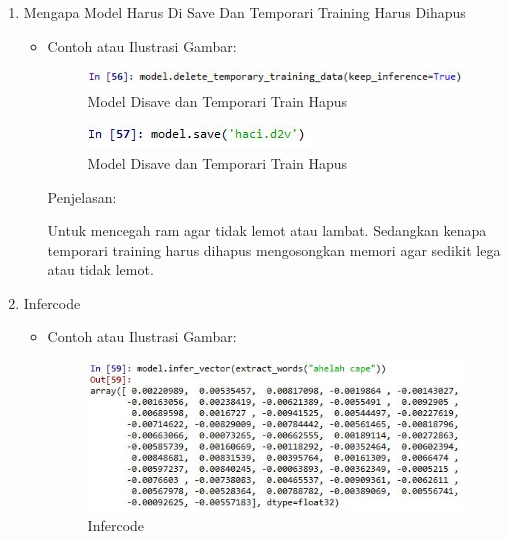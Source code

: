 \begin{enumerate}
\begin{itemize}
\end{itemize}

\item Mengapa Model Harus Di Save Dan Temporari Training Harus Dihapus
\begin{itemize}
\item Contoh atau Ilustrasi Gambar:

\begin{figure}[!hbtp]
\centering
\includegraphics[scale=0.7]{figures/1174031/5/49.jpg}
\caption{Model Disave dan Temporari Train Hapus}
\label{Model Disave dan Temporari Train Hapus}
\end{figure}

\begin{figure}[!hbtp]
\centering
\includegraphics[scale=0.7]{figures/1174031/5/50.jpg}
\caption{Model Disave dan Temporari Train Hapus}
\label{Model Disave dan Temporari Train Hapus}
\end{figure}

Penjelasan:

Untuk mencegah ram agar tidak lemot atau lambat. Sedangkan kenapa temporari training harus dihapus mengosongkan memori agar sedikit lega atau tidak lemot.

\end{itemize}

\item Infercode
\begin{itemize}
\item Contoh atau Ilustrasi Gambar:

\begin{figure}[!hbtp]
\centering
\includegraphics[scale=0.7]{figures/1174031/5/51.jpg}
\caption{Infercode}
\label{Infercode}
\end{figure}


\end{itemize}
\end{enumerate}
